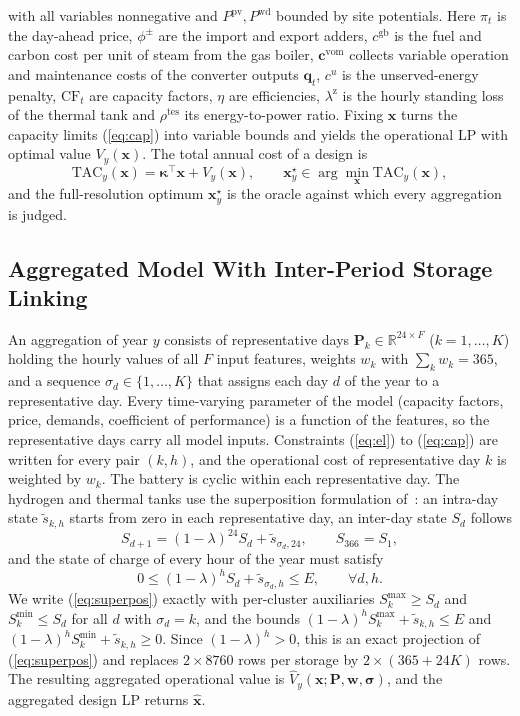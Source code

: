 \documentclass[journal]{IEEEtran}
\begin{document}
with all variables nonnegative and $P^{\mathrm{pv}},P^{\mathrm{wd}}$ bounded by site potentials. Here $\pi_t$ is the day-ahead price, $\phi^{\pm}$ are the import and export adders, $c^{\mathrm{gb}}$ is the fuel and carbon cost per unit of steam from the gas boiler, $\bm{c}^{\mathrm{vom}}$ collects variable operation and maintenance costs of the converter outputs $\bm{q}_t$, $c^{u}$ is the unserved-energy penalty, $\mathrm{CF}_t$ are capacity factors, $\eta$ are efficiencies, $\lambda^{\mathrm{z}}$ is the hourly standing loss of the thermal tank and $\rho^{\mathrm{tes}}$ its energy-to-power ratio. Fixing $\bm{x}$ turns the capacity limits (\ref{eq:cap}) into variable bounds and yields the operational LP with optimal value $V_y(\bm{x})$. The total annual cost of a design is
\begin{equation}
\mathrm{TAC}_y(\bm{x})=\bm{\kappa}^{\top}\bm{x}+V_y(\bm{x}),\qquad \bm{x}^{\star}_y\in\arg\min_{\bm{x}}\mathrm{TAC}_y(\bm{x}), \label{eq:tac}
\end{equation}
and the full-resolution optimum $\bm{x}^{\star}_y$ is the oracle against which every aggregation is judged.

\subsection{Aggregated Model With Inter-Period Storage Linking}
An aggregation of year $y$ consists of representative days $\bm{P}_k\in\mathbb{R}^{24\times F}$ ($k=1,\dots,K$) holding the hourly values of all $F$ input features, weights $w_k$ with $\sum_k w_k=365$, and a sequence $\sigma_d\in\{1,\dots,K\}$ that assigns each day $d$ of the year to a representative day. Every time-varying parameter of the model (capacity factors, price, demands, coefficient of performance) is a function of the features, so the representative days carry all model inputs. Constraints (\ref{eq:el}) to (\ref{eq:cap}) are written for every pair $(k,h)$, and the operational cost of representative day $k$ is weighted by $w_k$. The battery is cyclic within each representative day. The hydrogen and thermal tanks use the superposition formulation of~\cite{kotzur2018seasonal}: an intra-day state $\tilde{s}_{k,h}$ starts from zero in each representative day, an inter-day state $S_d$ follows
\begin{equation}
S_{d+1}=(1-\lambda)^{24}S_d+\tilde{s}_{\sigma_d,24},\qquad S_{366}=S_1, \label{eq:inter}
\end{equation}
and the state of charge of every hour of the year must satisfy
\begin{equation}
0\le(1-\lambda)^{h}S_d+\tilde{s}_{\sigma_d,h}\le E,\qquad \forall d,h. \label{eq:superpos}
\end{equation}
We write (\ref{eq:superpos}) exactly with per-cluster auxiliaries $S^{\max}_k\ge S_d$ and $S^{\min}_k\le S_d$ for all $d$ with $\sigma_d=k$, and the bounds $(1-\lambda)^{h}S^{\max}_k+\tilde{s}_{k,h}\le E$ and $(1-\lambda)^{h}S^{\min}_k+\tilde{s}_{k,h}\ge 0$. Since $(1-\lambda)^{h}>0$, this is an exact projection of (\ref{eq:superpos}) and replaces $2\times 8760$ rows per storage by $2\times(365+24K)$ rows. The resulting aggregated operational value is $\hat{V}_y(\bm{x};\bm{P},\bm{w},\bm{\sigma})$, and the aggregated design LP returns $\hat{\bm{x}}$.
\end{document}
